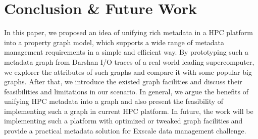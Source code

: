 \section{Conclusion \& Future Work}

In this paper, we proposed an idea of unifying rich metadata in a HPC platform into a property graph model, which supports a wide range of metadata management requirements in a simple and efficient way. By prototyping such a metadata graph from Darshan I/O traces of a real world leading supercomputer, we explorer the attributes of such graphs and compare it with some popular big graphs. After that, we introduce the existed graph facilities and discuss their feasibilities and limitations in our scenario. In general, we argue the benefits of unifying HPC metadata into a graph and also present the feasibility of implementing such a graph in current HPC platform. In future, the work will be implementing such a platform with optimized or tweaked graph facilities and provide a practical metadata solution for Exscale data management challenge. 